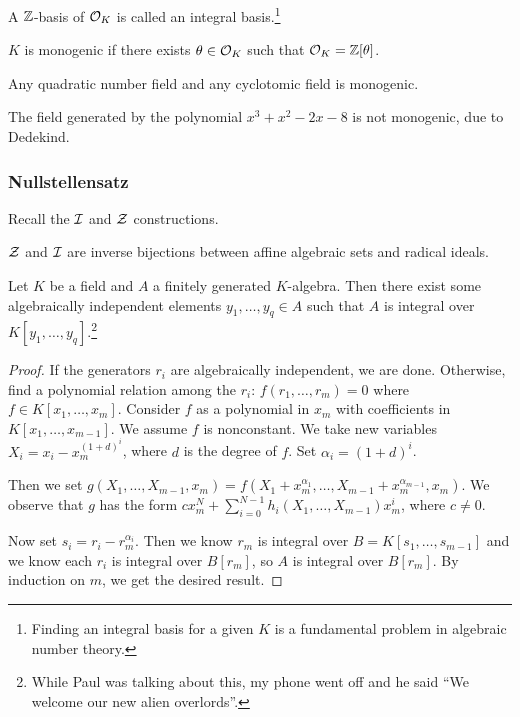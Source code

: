 \documentclass[10pt, twoside]{article}
\begin{document}
        \begin{defn} A $\mathbb{Z}$-basis of $\mathcal{O}_K$ is called an integral
        basis.\footnote{Finding an integral basis for a given $K$ is a
    fundamental problem in algebraic number theory.} \end{defn}
        
        \begin{defn} $K$ is monogenic if there exists $\theta \in \mathcal{O}_K$
        such that $\mathcal{O}_K = \mathbb{Z}[\theta]$.  \end{defn}

        \begin{exm} Any quadratic number field and any cyclotomic field is
            monogenic.  \end{exm} \begin{exm} The field generated by the
        polynomial $x^3+x^2-2x-8$ is not monogenic, due to Dedekind.  \end{exm}

        \subsubsection{Nullstellensatz} Recall the $\mathcal{I}$ and $\mathcal{Z}$
        constructions.

        \begin{thm} $\mathcal{Z}$ and $\mathcal{I}$ are inverse bijections between affine
        algebraic sets and radical ideals.  \end{thm}

        \begin{lem} Let $K$ be a field and $A$ a
            finitely generated $K$-algebra. Then there exist some algebraically
            independent elements $y_1, \ldots, y_q \in A$ such that $A$ is
            integral over $K[y_1, \ldots, y_q]$.\footnote{While Paul was
            talking about this, my phone went off and he said ``We welcome our
        new alien overlords''.} \begin{proof} If the generators $r_i$ are
            algebraically independent, we are done. Otherwise, find a
            polynomial relation among the $r_i$: $f(r_1, \ldots, r_m) = 0$
            where $f \in K[x_1, \ldots, x_m]$. Consider $f$ as a polynomial in
            $x_m$ with coefficients in $K[x_1, \ldots, x_{m-1}]$. We assume $f$
            is nonconstant. We take new variables $X_i = x_i-x_m^{(1+d)^i}$,
            where $d$ is the degree of $f$. Set $\alpha_i = (1+d)^i$.

                Then we set $g(X_1, \ldots, X_{m-1}, x_m) =
                f(X_1+x_m^{\alpha_1}, \ldots, X_{m-1} +
                x_m^{\alpha_{m-1}},x_m)$. We observe that $g$ has the form
                $cx_m^N + \sum_{i=0}^{N-1} h_i(X_1, \ldots, X_{m-1})x_m^i$,
                where $c \neq 0$.

                Now set $s_i = r_i - r_m^{\alpha_i}$. Then we know $r_m$ is
            integral over $B=K[s_1, \ldots, s_{m-1}]$ and we know each $r_i$ is
        integral over $B[r_m]$, so $A$ is integral over $B[r_m]$. By induction
    on $m$, we get the desired result.  \end{proof} \end{lem}
\end{document}
